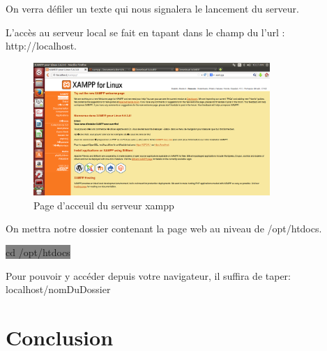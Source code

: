 \documentclass[11pt,a4paper,titlepage, oneside]{article}
\begin{document}
	On verra défiler un texte qui nous signalera le lancement du serveur.
	
	L'accès au serveur local se fait en tapant dans le champ du l'url : http://localhost.
	
	\begin{figure}[h]
                        \centering
                        \includegraphics[width=0.8\textwidth,natwidth=310,natheight=242]{images/xampp.png}
                        \caption{Page d'acceuil du serveur xampp}
    	    \end{figure}
    	    
    	    On mettra notre dossier contenant la page web au niveau de /opt/htdocs.
    	    
    	    \colorbox{gray}{cd /opt/htdocs}
	
	Pour pouvoir y accéder depuis votre navigateur, il suffira de taper: localhost/nomDuDossier
	

\newpage
\section{{\color{red}Conclusion}}
	

%		
%		
%		
%		
%
		
\end{document}
